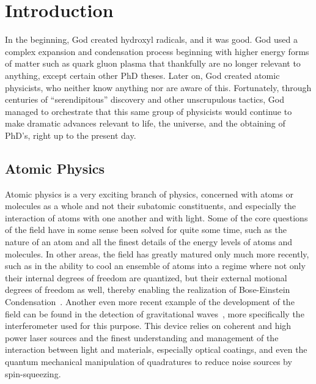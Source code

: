 \ifx\justbeingincluded\undefined


\fi

\chapter{Introduction}
\label{iii}

In the beginning, God created hydroxyl radicals, and it was good. God used a complex expansion and condensation process beginning with higher energy forms of matter such as quark gluon plasma that thankfully are no longer relevant to anything, except certain other PhD theses.
Later on, God created atomic physicists, who neither know anything nor are aware of this.
Fortunately, through centuries of ``serendipitous'' discovery and other unscrupulous tactics, God managed to orchestrate that this same group of physicists would continue to make dramatic advances relevant to life, the universe, and the obtaining of PhD's, right up to the present day.

\section{Atomic Physics}

Atomic physics is a very exciting branch of physics, concerned with atoms or molecules as a whole and not their subatomic constituents, and especially the interaction of atoms with one another and with light.
Some of the core questions of the field have in some sense been solved for quite some time, such as the nature of an atom and all the finest details of the energy levels of atoms and molecules.
In other areas, the field has greatly matured only much more recently, such as in the ability to cool an ensemble of atoms into a regime where not only their internal degrees of freedom are quantized, but their external motional degrees of freedom as well, thereby enabling the realization of Bose-Einstein Condensation~\cite{Anderson1995,Davis1995}.
Another even more recent example of the development of the field can be found in the detection of gravitational waves~\cite{Abbott2016}, more specifically the interferometer used for this purpose. 
This device relies on coherent and high power laser sources and the finest understanding and management of the interaction between light and materials, especially optical coatings, and even the quantum mechanical manipulation of quadratures to reduce noise sources by spin-squeezing.


